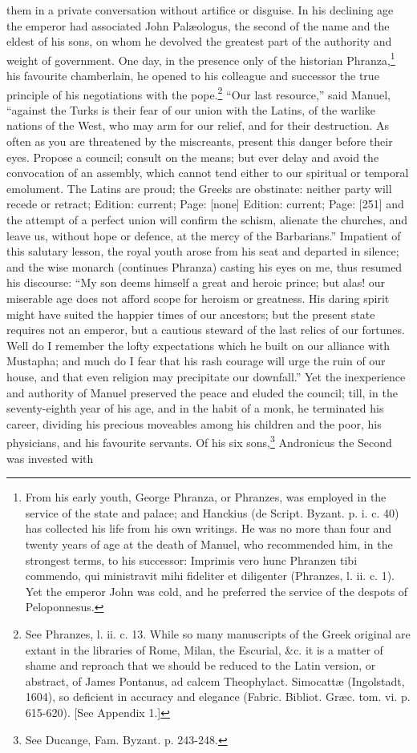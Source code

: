 them in a private conversation without artifice or disguise. In his declining age the emperor had associated John Palæologus, the second of the name and the eldest of his sons, on whom he devolved the greatest part of the authority and weight of government. One day, in the presence only of the historian Phranza,\footnote{From his early youth, George Phranza, or Phranzes, was employed in the service of the state and palace; and Hanckius (de Script. Byzant. p. i. c. 40) has collected his life from his own writings. He was no more than four and twenty years of age at the death of Manuel, who recommended him, in the strongest terms, to his successor: Imprimis vero hunc Phranzen tibi commendo, qui ministravit mihi fideliter et diligenter (Phranzes, l. ii. c. 1). Yet the emperor John was cold, and he preferred the service of the despots of Peloponnesus.} his favourite chamberlain, he opened to his colleague and successor the true principle of his negotiations with the pope.\footnote{See Phranzes, l. ii. c. 13. While so many manuscripts of the Greek original are extant in the libraries of Rome, Milan, the Escurial, \&c. it is a matter of shame and reproach that we should be reduced to the Latin version, or abstract, of James Pontanus, ad calcem Theophylact. Simocattæ (Ingolstadt, 1604), so deficient in accuracy and elegance (Fabric. Bibliot. Græc. tom. vi. p. 615-620). [See Appendix 1.]} \texthebrew{“}Our last resource,\texthebrew{}” said Manuel, \texthebrew{“}against the Turks is their fear of our union with the Latins, of the warlike nations of the West, who may arm for our relief, and for their destruction. As often as you are threatened by the miscreants, present this danger before their eyes. Propose a council; consult on the means; but ever delay and avoid the convocation of an assembly, which cannot tend either to our spiritual or temporal emolument. The Latins are proud; the Greeks are obstinate: neither party will recede or retract; Edition: current; Page: [none] Edition: current; Page: [251] and the attempt of a perfect union will confirm the schism, alienate the churches, and leave us, without hope or defence, at the mercy of the Barbarians.\texthebrew{}” Impatient of this salutary lesson, the royal youth arose from his seat and departed in silence; and the wise monarch (continues Phranza) casting his eyes on me, thus resumed his discourse: \texthebrew{“}My son deems himself a great and heroic prince; but alas! our miserable age does not afford scope for heroism or greatness. His daring spirit might have suited the happier times of our ancestors; but the present state requires not an emperor, but a cautious steward of the last relics of our fortunes. Well do I remember the lofty expectations which he built on our alliance with Mustapha; and much do I fear that his rash courage will urge the ruin of our house, and that even religion may precipitate our downfall.\texthebrew{}” Yet the inexperience and authority of Manuel preserved the peace and eluded the council; till, in the seventy-eighth year of his age, and in the habit of a monk, he terminated his career, dividing his precious moveables among his children and the poor, his physicians, and his favourite servants. Of his six sons,\footnote{See Ducange, Fam. Byzant. p. 243-248.} Andronicus the Second was invested with 
